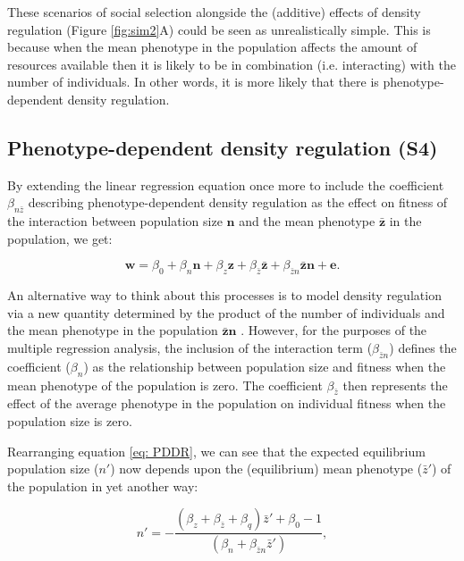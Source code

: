\documentclass{article}
\begin{document}
These scenarios of social selection alongside the (additive) effects of density regulation (Figure \ref{fig:sim2}A) could be seen as unrealistically simple. This is because when the mean phenotype in the population affects the amount of resources available then it is likely to be in combination (i.e. interacting) with the number of individuals. In other words, it is more likely that there is phenotype-dependent density regulation. 

\subsection{Phenotype-dependent density regulation (S4)}

By extending the linear regression equation once more to include the coefficient $\beta_{n \bar{z}}$ describing phenotype-dependent density regulation as the effect on fitness of the interaction between population size $\mathbf{n}$ and the mean phenotype $\bar{\mathbf{z}}$ in the population, we get: 

\begin{equation} \label{eq: PDDR}
\mathbf{w}=\beta_{0} +\beta_{n} \mathbf{n} + \beta_{z} \mathbf{z}+ \beta_{\bar{z}} \bar{\mathbf{z}} + \beta_{\bar{z}n} \bar{\mathbf{z}} \mathbf{n}  +  \mathbf{e}.
\end{equation}

An alternative way to think about this processes is to model density regulation via a new quantity determined by the product of the number of individuals and the mean phenotype in the population $\bar{\mathbf{z}}\mathbf{n}$ \citep{Engen2020}. However, for the purposes of the multiple regression analysis, the inclusion of the interaction term ($\beta_{\bar{z}n}$) defines the coefficient ($\beta_{n}$) as the relationship between population size and fitness when the mean phenotype of the population is zero. The coefficient $ \beta_{\bar{z}}$ then represents the effect of the average phenotype in the population on individual fitness when the population size is zero. 

Rearranging equation \ref{eq: PDDR}, we can see that the expected equilibrium population size ($n'$) now depends upon the (equilibrium) mean phenotype ($\bar{z}'$) of the population in yet another way:

\begin{equation}
n' = -\frac{(\beta_{z}  + \beta_{\bar{z}} + \beta_{q})\bar{z}'+\beta_{0} -1}{(\beta_{n} +  \beta_{\bar{z}n} \bar{z}')},
\end{equation}
\end{document}
